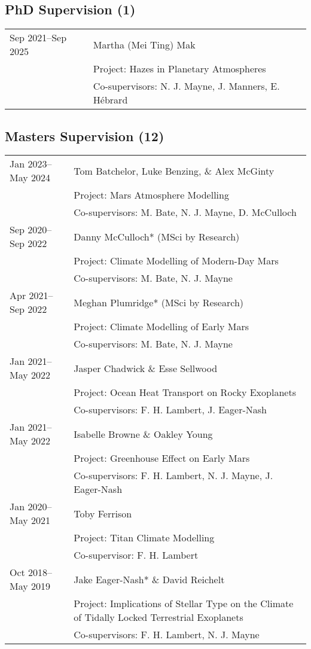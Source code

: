 \documentclass[a4paper, 11pt]{article}
\begin{document}
\subsection*{PhD Supervision (1)}
\begin{tabularx}{\linewidth}{@{}l X@{}}
Sep 2021--Sep 2025 & Martha (Mei Ting) Mak \\
                  & Project: Hazes in Planetary Atmospheres \\
                  & Co-supervisors: N. J. Mayne, J. Manners, E. Hébrard \\
\end{tabularx}

\subsection*{Masters Supervision (12)}
\begin{tabularx}{\linewidth}{@{}l X@{}}
Jan 2023--May 2024 & Tom Batchelor, Luke Benzing, \& Alex McGinty \\
                  & Project: Mars Atmosphere Modelling \\
                  & Co-supervisors: M. Bate, N. J. Mayne, D. McCulloch \\
Sep 2020--Sep 2022 & Danny McCulloch* (MSci by Research) \\
                  & Project: Climate Modelling of Modern-Day Mars \\
                  & Co-supervisors: M. Bate, N. J. Mayne \\
Apr 2021--Sep 2022 & Meghan Plumridge* (MSci by Research) \\
                  & Project: Climate Modelling of Early Mars \\
                  & Co-supervisors: M. Bate, N. J. Mayne \\
Jan 2021--May 2022 & Jasper Chadwick \& Esse Sellwood \\
                  & Project: Ocean Heat Transport on Rocky Exoplanets \\
                  & Co-supervisors: F. H. Lambert, J. Eager-Nash \\
Jan 2021--May 2022 & Isabelle Browne \& Oakley Young \\
                  & Project: Greenhouse Effect on Early Mars \\
                  & Co-supervisors: F. H. Lambert, N. J. Mayne, J. Eager-Nash \\
Jan 2020--May 2021 & Toby Ferrison \\
                  & Project: Titan Climate Modelling \\
                  & Co-supervisor: F. H. Lambert \\
Oct 2018--May 2019 & Jake Eager-Nash* \& David Reichelt \\
                  & Project: Implications of Stellar Type on the Climate of Tidally Locked Terrestrial Exoplanets \\
                  & Co-supervisors: F. H. Lambert, N. J. Mayne \\
\end{tabularx}
\end{document}
